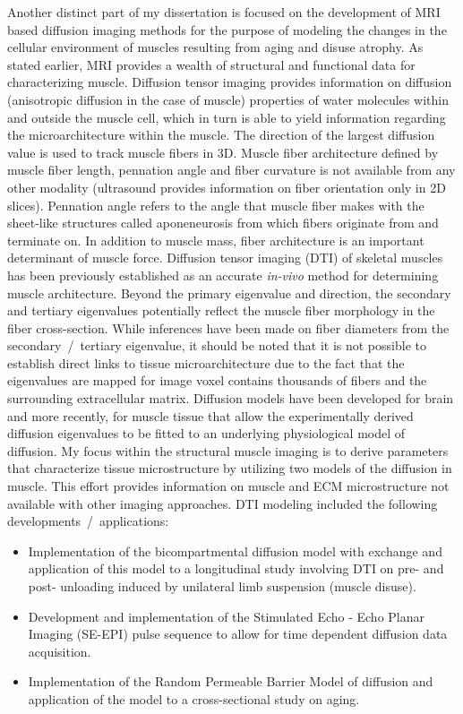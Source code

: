 Another distinct part of my dissertation is focused on the development of MRI based diffusion imaging methods for the purpose of modeling the changes in the cellular environment of muscles resulting from aging and disuse atrophy.
As stated earlier, MRI provides a wealth of structural and functional data for characterizing muscle. 
Diffusion tensor imaging provides information on diffusion (anisotropic diffusion in the case of muscle) properties of water molecules within and outside the muscle cell, which in turn is able to yield information regarding the microarchitecture within the muscle. 
The direction of the largest diffusion value is used to track muscle fibers in 3D. 
Muscle fiber architecture defined by muscle fiber length, pennation angle and fiber curvature is not available from any other modality (ultrasound provides information on fiber orientation only in 2D slices). 
Pennation angle refers to the angle that muscle fiber makes with the sheet-like structures called aponeneurosis from which fibers originate from and terminate on. 
In addition to muscle mass, fiber architecture is an important determinant of muscle force. 
Diffusion tensor imaging (DTI) of skeletal muscles has been previously established as an accurate \textit{in-vivo} method for determining muscle architecture. 
Beyond the primary eigenvalue and direction, the secondary and tertiary eigenvalues potentially reflect the muscle fiber morphology in the fiber cross-section. 
While inferences have been made on fiber diameters from the secondary~/~tertiary eigenvalue, it should be noted that it is not possible to establish direct links to tissue microarchitecture due to the fact that the eigenvalues are mapped for image voxel contains thousands of fibers and the surrounding extracellular matrix. 
Diffusion models have been developed for brain and more recently, for muscle tissue that allow the experimentally derived diffusion eigenvalues to be fitted to an underlying physiological model of diffusion. 
My focus within the structural muscle imaging is to derive parameters that characterize tissue microstructure by utilizing two models of the diffusion in muscle. 
This effort provides information on muscle and ECM microstructure not available with other imaging approaches. 
DTI modeling included the following developments~/~applications:
\begin{itemize}
\item Implementation of the bicompartmental diffusion model with exchange and application of this model to a longitudinal study involving DTI on pre- and post- unloading induced by unilateral limb suspension (muscle disuse).
\item Development and implementation of the Stimulated Echo - Echo Planar Imaging (SE-EPI) pulse sequence to allow for time dependent diffusion data acquisition.
\item Implementation of the Random Permeable Barrier Model of diffusion and application of the model to a cross-sectional study on aging.
\end{itemize}


